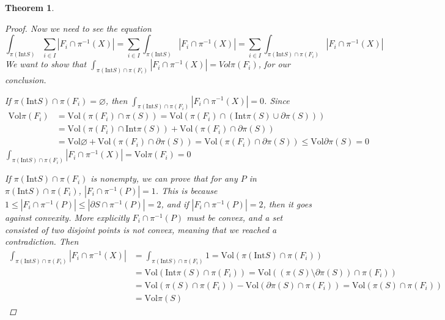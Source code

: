 \documentclass[a4paper]{article}
\newtheorem{thm}{Theorem}[subsection]
\theoremstyle{definition}
\begin{document}
\begin{thm}
\begin{proof}
Now we need to see the equation \begin{equation} \int_{\pi(\mathrm{Int}S)}\sum_{i\in I}|F_i\cap \pi^{-1}(X)|=\sum_{i\in I}\int_{\pi(\mathrm{Int}S)}|F_i\cap \pi^{-1}(X)|=\sum_{i\in I}\int_{\pi(\mathrm{Int}S)\cap \pi(F_i)}|F_i\cap \pi^{-1}(X)| \end{equation} We want to show that $\int_{\pi(\mathrm{Int}S)\cap \pi(F_i)}|F_i\cap \pi^{-1}(X)|=Vol\pi(F_i)$, for our conclusion.

If $\pi(\mathrm{Int}S)\cap \pi(F_i)=\varnothing$, then $\int_{\pi(\mathrm{Int}S)\cap \pi(F_i)}|F_i\cap \pi^{-1}(X)|=0$. Since 
\begin{equation}\begin{aligned}\mathrm{Vol}\pi(F_i) &=\mathrm{Vol}(\pi(F_i)\cap \pi(S))=\mathrm{Vol}(\pi(F_i)\cap (\mathrm{Int}\pi(S)\cup\partial \pi(S)))\\&=\mathrm{Vol}(\pi(F_i)\cap\mathrm{Int}\pi(S))+\mathrm{Vol}(\pi(F_i)\cap\partial \pi(S))\\
&=\mathrm{Vol}\varnothing +\mathrm{Vol}(\pi(F_i)\cap\partial \pi(S))=\mathrm{Vol}(\pi(F_i)\cap\partial \pi(S))\le \mathrm{Vol}\partial \pi(S)=0\end{aligned}\end{equation} $\int_{\pi(\mathrm{Int}S)\cap \pi(F_i)}|F_i\cap \pi^{-1}(X)|=\mathrm{Vol}\pi(F_i)=0$

If $\pi(\mathrm{Int}S)\cap \pi(F_i)$ is nonempty, we can prove that for any $P$ in $\pi(\mathrm{Int}S)\cap \pi(F_i)$, $|F_i\cap \pi^{-1}(P)|=1$. This is because $1\le|F_i\cap \pi^{-1}(P)|\le|\partial S\cap \pi^{-1}(P)|=2$, and if $|F_i\cap \pi^{-1}(P)|=2$, then it goes against convexity. More explicitly $F_i\cap \pi^{-1}(P)$ must be convex, and a set consisted of two disjoint points is not convex, meaning that we reached a contradiction. Then \begin{equation}\begin{aligned}\int_{\pi(\mathrm{Int}S)\cap \pi(F_i)}|F_i\cap \pi^{-1}(X)| 
&= \int_{\pi(\mathrm{Int}S)\cap \pi(F_i)}1=\mathrm{Vol}(\pi(\mathrm{Int}S)\cap \pi(F_i))\\ 
&= \mathrm{Vol}(\mathrm{Int}\pi(S)\cap \pi(F_i))= \mathrm{Vol}((\pi(S)\setminus\partial \pi(S))\cap \pi(F_i))\\ 
&= \mathrm{Vol}(\pi(S)\cap \pi(F_i))-\mathrm{Vol}(\partial \pi(S)\cap \pi(F_i))= \mathrm{Vol}(\pi(S)\cap \pi(F_i))\\
&= \mathrm{Vol}\pi(S)\end{aligned}\end{equation}


\end{proof}
\end{thm}
\end{document}
